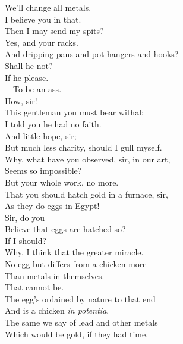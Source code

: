 \documentclass[a4paper,oneside,12pt]{memoir}
\begin{document}
\begin{drama*}
We'll change all metals.\\
\surlyspeaks {} I believe you in that.\\
\mammonspeaks Then I may send my spits?\\
\subtlespeaks {} Yes, and your racks.\\
\surlyspeaks And dripping-pans and pot-hangers and hooks?\\
Shall he not?\\
\subtlespeaks {} If he please.\\
\surlyspeaks {} ---To be an ass.\\
\subtlespeaks How, sir!\\
\mammonspeaks {} This gentleman you must bear withal:\\
I told you he had no faith.\\
\surlyspeaks {} And little hope, sir;\\
But much less charity, should I gull myself.\\
\subtlespeaks Why, what have you observed, sir, in our art,\\
Seems so impossible?\\
\surlyspeaks {} But your whole work, no more.\\
That you should hatch gold in a furnace, sir,\\
As they do eggs in Egypt!\\
\subtlespeaks {} Sir, do you\\
Believe that eggs are hatched so?\\
\surlyspeaks {} If I should?\\
\subtlespeaks Why, I think that the greater miracle.\\
No egg but differs from a chicken more\\
Than metals in themselves.\\
\surlyspeaks {} That cannot be.\\
The egg's ordained by nature to that end\\
And is a chicken \emph{in potentia}.\\
\subtlespeaks The same we say of lead and other metals\\
Which would be gold, if they had time.\\

\end{drama*}
\end{document}
